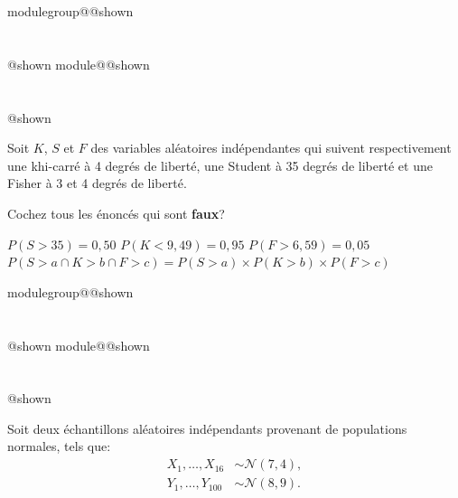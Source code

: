 \documentclass{Evaluation}
\makeatletter
\newcommand{\currentmodulekey}{}
\newcommand{\currentmoduletitle}{}
\newcommand{\currentgroupkey}{}
\newcommand{\currentgrouptitle}{}
\newcommand{\showmoduleifneeded}{%
  \ifx\currentgroupkey\empty\else
    \expandafter\ifx\csname modulegroup@\currentgroupkey @shown\endcsname\relax
      \section*{\currentgrouptitle}%
      \expandafter\gdef\csname modulegroup@\currentgroupkey @shown\endcsname{1}%
    \fi
  \fi
  \expandafter\ifx\csname module@\currentmodulekey @shown\endcsname\relax
    \section*{\currentmoduletitle}%
    \expandafter\gdef\csname module@\currentmodulekey @shown\endcsname{1}%
  \fi
}
\newenvironment{H24}{\showmoduleifneeded}{}
\newenvironment{A24}{\showmoduleifneeded}{}
\makeatother
\begin{document}
\begin{questions}
\begin{H24}
\question {} %
Soit $K$, $S$ et $F$ des variables aléatoires indépendantes qui suivent respectivement une khi-carré à 4 degrés de liberté, une Student à 35 degrés de liberté et une Fisher à 3 et 4 degrés de liberté.

Cochez tous les énoncés qui sont \textbf{faux}?

\begin{checkboxes}
		\correctchoice $P(S>35)=0,50$
		\choice $P(K<9,49)=0,95$
		\choice $P(F>6,59)=0,05$
		\choice $P(S>a \cap K> b \cap F >c)= P(S>a)\times P(K>b)\times P(F>c)$
\end{checkboxes}
\end{H24}

\begin{A24}
\question {} %
Soit deux échantillons aléatoires indépendants provenant de populations normales, tels que:
\begin{align*}
    X_1,\hdots,X_{16}&\sim\mathcal{N}(7, 4),\\
    Y_1,\hdots,Y_{100}&\sim\mathcal{N}(8, 9).
\end{align*}

\end{A24}
\end{questions}
\end{document}
